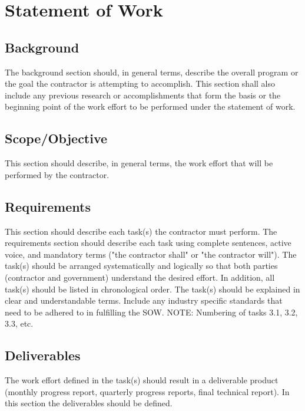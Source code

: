 \section{Statement of Work}

\subsection{Background}


The background section should, in general terms, describe the overall program or the goal the contractor is attempting to accomplish.  This section shall also include any previous research or accomplishments that form the basis or the beginning point of the work effort to be performed under the statement of work.

\subsection{Scope/Objective}

This section should describe, in general terms, the work effort that will be performed by the contractor.  

\subsection{Requirements}

This section should describe each task(s) the contractor must perform.  The requirements section should describe each task using complete sentences, active voice, and mandatory terms ("the contractor shall" or "the contractor will").  The task(s) should be arranged systematically and logically so that both parties (contractor and government) understand the desired effort.  In addition, all task(s) should be listed in chronological order.  The task(s) should be explained in clear and understandable terms.  Include any industry specific standards that need to be adhered to in fulfilling the SOW.
NOTE:  Numbering of tasks 3.1, 3.2, 3.3, etc.



\subsection{Deliverables}

The work effort defined in the task(s) should result in a deliverable product (monthly progress report, quarterly progress reports, final technical report).  In this section the deliverables should be defined.  